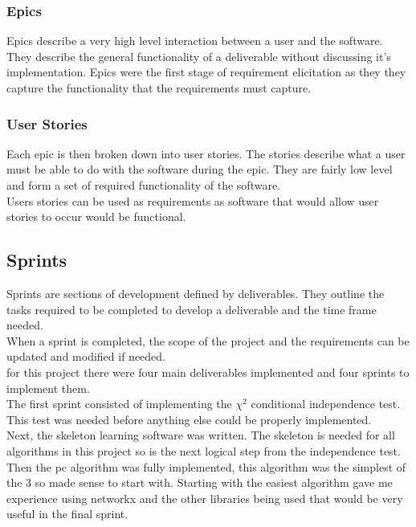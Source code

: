 \documentclass{article}
\begin{document}
\subsubsection{Epics}
Epics describe a very high level interaction between a user and the software. They describe the general functionality of a deliverable without discussing it's implementation. Epics were the first stage of requirement elicitation as they they capture the functionality that the requirements must capture.
\subsubsection{User Stories}
Each epic is then broken down into user stories. The stories describe what a user must be able to do with the software during the epic. They are fairly low level and form a set of required functionality of the software.\\

Users stories can be used as requirements as software that would allow user stories to occur would be functional.

\subsection{Sprints}
Sprints are sections of development defined by deliverables. They outline the tasks required to be completed to develop a deliverable and the time frame needed.\\

When a sprint is completed, the scope of the project and the requirements can be updated and modified if needed.\\



for this project there were four main deliverables implemented and four sprints to implement them.\\

The first sprint consisted of implementing the $\chi ^2$ conditional independence test. This test was needed before anything else could be properly implemented.\\

Next, the skeleton learning software was written. The skeleton is needed for all algorithms in this project so is the next logical step from the independence test.\\

Then the pc algorithm was fully implemented, this algorithm was the simplest of the 3 so made sense to start with. Starting with the easiest algorithm gave me experience using networkx and the other libraries being used that would be very useful in the final sprint.\\
\end{document}
